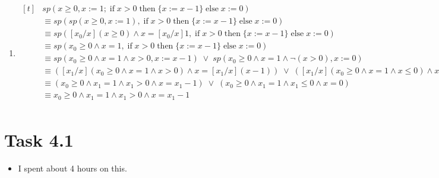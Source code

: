 \documentclass{article}
\newcommand{\answer}{\item[]} %
\begin{document}
\begin{enumerate}[label = {(\alph*)}]
			\item
			$\begin{aligned}[t]
				&sp(x \geq 0, x := 1; \; \text{if} \; x > 0 \; \text{then} \; \{x := x - 1\} \; \text{else} \; {x := 0}) \\
				&\equiv sp(sp(x \geq 0, x := 1), \; \text{if} \; x > 0 \; \text{then} \; \{x := x - 1\} \; \text{else} \; {x := 0}) \\
				&\equiv sp([x_{0}/x] (x \geq 0) \land x = [x_{0}/x]1, \; \text{if} \; x > 0 \; \text{then} \; \{x := x - 1\} \; \text{else} \; {x := 0}) \\
				&\equiv sp(x_{0} \geq 0 \land x = 1, \; \text{if} \; x > 0 \; \text{then} \; \{x := x - 1\} \; \text{else} \; {x := 0}) \\
				&\equiv sp(x_{0} \geq 0 \land x = 1 \land x > 0, x := x - 1) \; \lor \; sp(x_{0} \geq 0 \land x = 1 \land \neg (x > 0), x := 0)\\
				&\equiv ([x_{1}/x](x_{0} \geq 0 \land x = 1 \land x > 0) \land x = [x_{1}/x](x - 1)) \; \lor \; ([x_{1}/x](x_{0} \geq 0 \land x = 1 \land x \leq 0) \land x = [x_{1}/x]0)\\
				&\equiv (x_{0} \geq 0 \land x_{1} = 1 \land x_{1} > 0 \land x = x_{1} - 1) \; \lor \; (x_{0} \geq 0 \land x_{1} = 1 \land x_{1} \leq 0 \land x = 0)\\
				&\equiv x_{0} \geq 0 \land x_{1} = 1 \land x_{1} > 0 \land x = x_{1} - 1 \\
			\end{aligned}$
		\end{enumerate}
	
	\section{Task 4.1}
		\begin{itemize}
			
			\answer I spent about 4 hours on this.
			
		\end{itemize}
	
\end{document}
